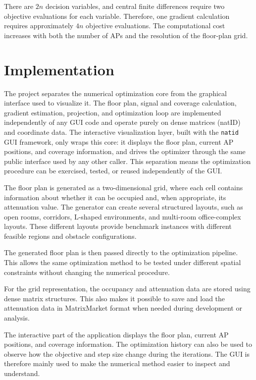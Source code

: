 \documentclass[11pt]{article}
\begin{document}
There are $2n$ decision variables, and central finite differences
require two objective evaluations for each variable. Therefore, one
gradient calculation requires approximately $4n$ objective
evaluations. The computational cost increases with both the number of
APs and the resolution of the floor-plan grid.

\section{Implementation}

The project separates the numerical optimization core from the
graphical interface used to visualize it. The floor plan, signal and
coverage calculation, gradient estimation, projection, and
optimization loop are implemented independently of any GUI code and
operate purely on dense matrices (natID) and coordinate data. The interactive
visualization layer, built with the \texttt{natid} GUI framework, only
wraps this core: it displays the floor plan, current AP positions, and
coverage information, and drives the optimizer through the same
public interface used by any other caller. This separation means the
optimization procedure can be exercised, tested, or reused
independently of the GUI.

The floor plan is generated as a two-dimensional grid, where each cell
contains information about whether it can be occupied and, when
appropriate, its attenuation value. The generator can create several
structured layouts, such as open rooms, corridors, L-shaped
environments, and multi-room office-complex layouts. These different
layouts provide benchmark instances with different feasible regions
and obstacle configurations.

The generated floor plan is then passed directly to the optimization
pipeline. This allows the same optimization method to be tested under
different spatial constraints without changing the numerical
procedure.

For the grid representation, the occupancy and attenuation data are
stored using dense matrix structures. This also makes it possible to
save and load the attenuation data in MatrixMarket format when needed
during development or analysis.

The interactive part of the application displays the floor plan,
current AP positions, and coverage information. The optimization
history can also be used to observe how the objective and step size
change during the iterations. The GUI is therefore mainly used to make
the numerical method easier to inspect and understand.
\end{document}
